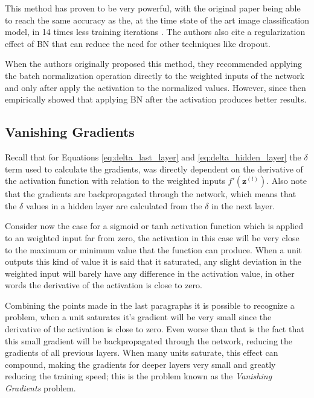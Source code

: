 This method has proven to be very powerful, with the original paper being able to reach the same accuracy as the, at the time state of the art image classification model, in 14 times less training iterations \cite{batchnorm2015}. The authors also cite a regularization effect of \gls{BN} that can reduce the need for other techniques like dropout.

When the authors originally proposed this method, they recommended applying the batch normalization operation directly to the weighted inputs of the network and only after apply the activation to the normalized values. However, since then \textcite{CaffeNetBench2017} empirically showed that applying \gls{BN} after the activation produces better results.

\subsection{Vanishing Gradients} \label{sub:vanishing_gradients}
Recall that for Equations \ref{eq:delta_last_layer} and \ref{eq:delta_hidden_layer} the $\delta$ term used to calculate the gradients, was directly dependent on the derivative of the activation function with relation to the weighted inputs $f'(\bm{z}^{(l)})$. Also note that the gradients are backpropagated through the network, which means that the $\delta$ values in a hidden layer are calculated from the $\delta$ in the next layer.

Consider now the case for a sigmoid or \gls{tanh} activation function which is applied to an weighted input far from zero, the activation in this case will be very close to the maximum or minimum value that the function can produce. When a unit outputs this kind of value it is said that it saturated, any slight deviation in the weighted input will barely have any difference in the activation value, in other words the derivative of the activation is close to zero.

Combining the points made in the last paragraphs it is possible to recognize a problem, when a unit saturates it's gradient will be very small since the derivative of the activation is close to zero. Even worse than that is the fact that this small gradient will be backpropagated through the network, reducing the gradients of all previous layers. When many units saturate, this effect can compound, making the gradients for deeper layers very small and greatly reducing the training speed; this is the problem known as the \textit{Vanishing Gradients} problem.


